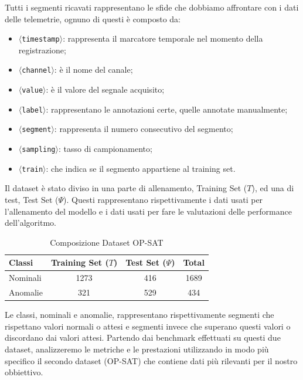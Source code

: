 Tutti i segmenti ricavati rappresentano le sfide che dobbiamo affrontare con i dati delle telemetrie, ognuno di questi è composto da:
\begin{itemize}
    \item $\langle$\texttt{timestamp}$\rangle$: rappresenta il marcatore temporale nel momento della registrazione;
    \item $\langle$\texttt{channel}$\rangle$: è il nome del canale;
    \item $\langle$\texttt{value}$\rangle$: è il valore del segnale acquisito;
    \item $\langle$\texttt{label}$\rangle$: rappresentano le annotazioni certe, quelle annotate manualmente;
    \item $\langle$\texttt{segment}$\rangle$: rappresenta il numero consecutivo del segmento;
    \item $\langle$\texttt{sampling}$\rangle$: tasso di campionamento;
    \item $\langle$\texttt{train}$\rangle$: che indica se il segmento appartiene al training set.
    
\end{itemize}

Il dataset è stato diviso in una parte di allenamento, Training Set ($T$), ed una di test, Test Set ($\Psi$). Questi rappresentano rispettivamente i dati usati per l'allenamento del modello e i dati usati per fare le valutazioni delle performance dell'algoritmo.

\begin{table}[h]
    \centering
    \begin{tabular}{|l|c|c|c|}
        \hline
        \textbf{Classi} &\textbf{Training Set} ($T$) & \textbf{Test Set ($\Psi$)}&\textbf{Total} \\
        \hline
         Nominali& 1273&416 &1689 \\
         Anomalie& 321&529 &434\\
         \hline
    \end{tabular}
    \caption{Composizione Dataset OP-SAT}
    \label{tab:dataset_op-sat}
\end{table}

Le classi, nominali e anomalie, rappresentano rispettivamente segmenti che rispettano valori normali o attesi e segmenti invece che superano questi valori o discordano dai valori attesi.
Partendo dai benchmark effettuati su questi due dataset, analizzeremo le metriche e le prestazioni utilizzando in modo più specifico il secondo dataset (OP-SAT) che contiene dati più rilevanti per il nostro obbiettivo.

